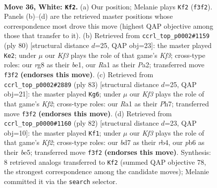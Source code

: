 \documentclass[11pt]{article}
\begin{document}
\clearpage

\begin{figure}[p]\centering
\begin{subfigure}{0.46\textwidth}\centering
\resizebox{\linewidth}{!}{%
\newchessgame
\chessboard[
  setfen={6r1/3bk3/1p6/p3p3/P3N3/1P3KP1/8/R7 w - - 2 36},
  showmover=false,
  pgfstyle=straightmove, color=movearrow, markmove={f3-f2}
]}
\caption{}
\end{subfigure}\hfill
\begin{subfigure}{0.46\textwidth}\centering
\resizebox{\linewidth}{!}{%
\newchessgame
\chessboard[
  setfen={8/3k4/p2p4/4pN1p/2P1P2P/5K2/P7/4b3 w - - 4 41},
  showmover=false,
  pgfstyle=straightmove, color=movearrow, markmove={f3-e2}
]}
\caption{}
\end{subfigure}
\\[4pt]
\begin{subfigure}{0.46\textwidth}\centering
\resizebox{\linewidth}{!}{%
\newchessgame
\chessboard[
  setfen={8/5k1p/4np2/6p1/4P1P1/4BP2/4K2P/8 b - - 6 42},
  showmover=false,
  pgfstyle=straightmove, color=movearrow, markmove={f7-g6}
]}
\caption{}
\end{subfigure}\hfill
\begin{subfigure}{0.46\textwidth}\centering
\resizebox{\linewidth}{!}{%
\newchessgame
\chessboard[
  setfen={8/8/4k3/p3b1p1/1r4P1/1P1R1P2/4NK2/8 w - - 3 42},
  showmover=false,
  pgfstyle=straightmove, color=movearrow, markmove={f2-f1}
]}
\caption{}
\end{subfigure}
\caption{\textbf{Move 36, White: \texttt{Kf2}.} (a) Our position; Melanie plays \texttt{Kf2} (\texttt{f3f2}). Panels (b)--(d) are the retrieved master positions whose correspondence most drove this move (highest QAP objective among those that transfer to it). (b) Retrieved from \texttt{ccrl\_top\_p0002\#1159} (ply 80) [structural distance $d$=25, QAP obj=23]: the master played \texttt{Ke2}; under $\mu$ our \emph{Kf3} plays the role of that game's \emph{Kf3}; cross-type roles: our \emph{r}g8 as their \emph{b}e1, our \emph{R}a1 as their \emph{P}a2; transferred move \texttt{f3f2} \textbf{(endorses this move)}. (c) Retrieved from \texttt{ccrl\_top\_p0002\#2889} (ply 83) [structural distance $d$=25, QAP obj=21]: the master played \texttt{Kg6}; under $\mu$ our \emph{Kf3} plays the role of that game's \emph{Kf2}; cross-type roles: our \emph{R}a1 as their \emph{P}h7; transferred move \texttt{f3f2} \textbf{(endorses this move)}. (d) Retrieved from \texttt{ccrl\_top\_p0000\#1160} (ply 82) [structural distance $d$=23, QAP obj=10]: the master played \texttt{Kf1}; under $\mu$ our \emph{Kf3} plays the role of that game's \emph{Kf2}; cross-type roles: our \emph{b}d7 as their \emph{r}b4, our \emph{p}b6 as their \emph{b}e5; transferred move \texttt{f3f2} \textbf{(endorses this move)}. Synthesis: 8 retrieved analogs transferred to \texttt{Kf2} (summed QAP objective 78, the strongest correspondence among the candidate moves); Melanie committed it via the \texttt{search} selector.}
\label{fig:thought-m70}
\end{figure}
\end{document}
